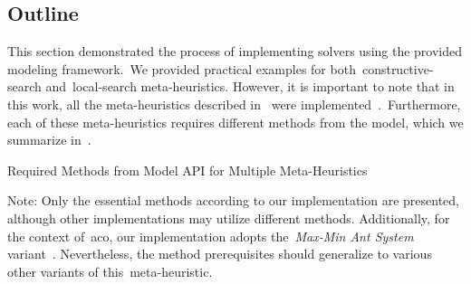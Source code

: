 \subsection{Outline}
\label{subsec:solver-outline}

This section demonstrated the process of implementing solvers using the provided
modeling framework.~We provided practical examples for
both~\acrshort{constructive-search} and~\acrshort{local-search} meta-heuristics.
However, it is important to note that in this work, all the meta-heuristics
described in~ were
implemented~\cite{rodriguesnasf4niopy}.~Furthermore, each of these
meta-heuristics requires different methods from the model, which we summarize
in~.

\begin{table}[h]
  \centering
  
  \caption{Required Methods from Model API for Multiple Meta-Heuristics}
  \caption*{\small Note: Only the essential methods according to our
    implementation are presented, although other implementations may utilize
    different methods. Additionally, for the context of~\acrshort{aco}, our
    implementation adopts the~\emph{Max-Min Ant System} variant~\cite{stutzle1999maxmin}. Nevertheless, the
    method prerequisites should generalize to various other variants of this~\acrshort{meta-heuristic}.}
  \label{tab:mh-api-methods}
\end{table}